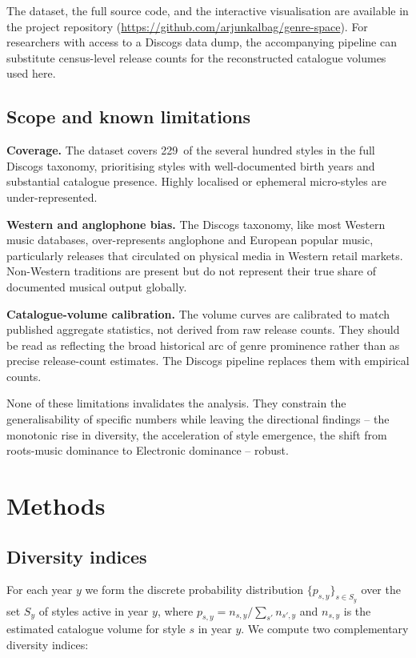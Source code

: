 \documentclass[12pt, a4paper]{article}
\newcommand{\gsNStyles}{229}%
\begin{document}
The dataset, the full source code, and the interactive visualisation are
available in the project repository
(\url{https://github.com/arjunkalbag/genre-space}).
For researchers with access to a Discogs data dump, the accompanying pipeline
can substitute census-level release counts for the reconstructed catalogue
volumes used here.

\subsection{Scope and known limitations}

\textbf{Coverage.} The dataset covers \gsNStyles\ of the several hundred
styles in the full Discogs taxonomy, prioritising styles with well-documented
birth years and substantial catalogue presence. Highly localised or
ephemeral micro-styles are under-represented.

\textbf{Western and anglophone bias.} The Discogs taxonomy, like most
Western music databases, over-represents anglophone and European popular
music, particularly releases that circulated on physical media in Western
retail markets. Non-Western traditions are present but do not represent
their true share of documented musical output globally.

\textbf{Catalogue-volume calibration.} The volume curves are calibrated
to match published aggregate statistics, not derived from raw release counts.
They should be read as reflecting the broad historical arc of genre
prominence rather than as precise release-count estimates. The Discogs
pipeline replaces them with empirical counts.

None of these limitations invalidates the analysis. They constrain the
generalisability of specific numbers while leaving the directional findings
-- the monotonic rise in diversity, the acceleration of style emergence,
the shift from roots-music dominance to Electronic dominance -- robust.

\section{Methods}
\label{sec:methods}

\subsection{Diversity indices}

For each year $y$ we form the discrete probability distribution
$\{p_{s,y}\}_{s \in S_y}$ over the set $S_y$ of styles active in year $y$,
where $p_{s,y} = n_{s,y} / \sum_{s'} n_{s',y}$ and $n_{s,y}$ is the estimated
catalogue volume for style $s$ in year $y$.
We compute two complementary diversity indices:
\end{document}
